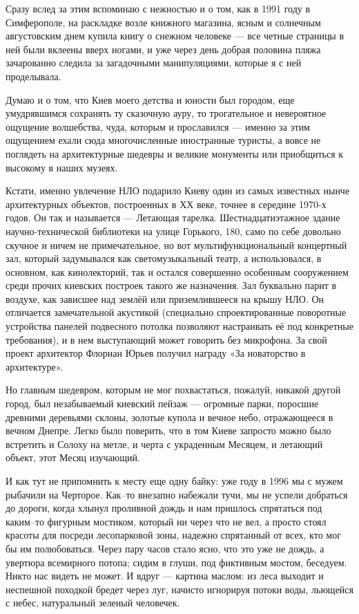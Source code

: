 Сразу вслед за этим вспоминаю с нежностью и о том, как в 1991 году в
Симферополе, на раскладке возле книжного магазина, ясным и солнечным
августовским днем купила книгу о снежном человеке — все четные страницы в ней
были вклеены вверх ногами, и уже через день добрая половина пляжа зачарованно
следила за загадочными манипуляциями, которые я с ней проделывала.

Думаю и о том, что Киев моего детства и юности был городом, еще умудрявшимся
сохранять ту сказочную ауру, то трогательное и невероятное ощущение волшебства,
чуда, которым и прославился — именно за этим ощущением ехали сюда
многочисленные иностранные туристы, а вовсе не поглядеть на архитектурные
шедевры и великие монументы или приобщиться к высокому в наших музеях.

\begin{zznagolos}
Кстати, именно увлечение НЛО подарило Киеву один из самых известных нынче
архитектурных объектов, построенных в ХХ веке, точнее в середине 1970-х годов.
Он так и называется — Летающая тарелка. Шестнадцатиэтажное здание
научно-технической библиотеки на улице Горького, 180, само по себе довольно
скучное и ничем не примечательное, но вот мультифункциональный концертный зал,
который задумывался как светомузыкальный театр, а использовался, в основном,
как кинолекторий, так и остался совершенно особенным сооружением среди прочих
киевских построек такого же назначения. Зал буквально парит в воздухе, как
зависшее над землёй или приземлившееся на крышу НЛО. Он отличается
замечательной акустикой (специально спроектированные поворотные устройства
панелей подвесного потолка позволяют настраивать её под конкретные требования),
и в нем выступающий может говорить без микрофона. За свой проект архитектор
Флориан Юрьев получил награду «За новаторство в архитектуре».
\end{zznagolos}

Но главным шедевром, которым не мог похвастаться, пожалуй, никакой другой
город, был незабываемый киевский пейзаж — огромные парки, поросшие древними
деревьями склоны, золотые купола и вечное небо, отражающееся в вечном Днепре.
Легко было поверить, что в том Киеве запросто можно было встретить и Солоху на
метле, и черта с украденным Месяцем, и летающий объект, этот Месяц изучающий.

И как тут не припомнить к месту еще одну байку: уже году в 1996 мы с мужем
рыбачили на Черторое. Как–то внезапно набежали тучи, мы не успели добраться до
дороги, когда хлынул проливной дождь и нам пришлось спрятаться под каким–то
фигурным мостиком, который ни через что не вел, а просто стоял красоты для
посреди лесопарковой зоны, надежно спрятанный от всех, кто мог бы им
полюбоваться. Через пару часов стало ясно, что это уже не дождь, а увертюра
всемирного потопа; сидим в глуши, под фиктивным мостом, беседуем. Никто нас
видеть не может. И вдруг — картина маслом: из леса выходит и неспешной походкой
бредет через луг, начисто игнорируя потоки воды, льющейся с небес, натуральный
зеленый человечек.


